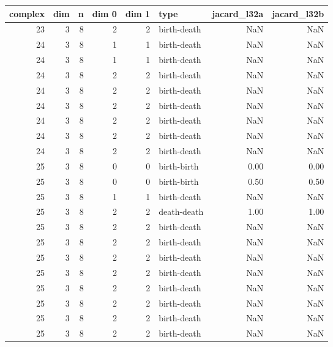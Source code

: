 \documentclass{article}
\begin{document}
\begin{center}
\begin{tabular}{rrrrrlrr}
\toprule
complex & dim & n & dim 0 & dim 1 & type & jacard\_l32a & jacard\_l32b \\
\midrule
23 & 3 & 8 & 2 & 2 & birth-death & NaN & NaN \\
24 & 3 & 8 & 1 & 1 & birth-death & NaN & NaN \\
24 & 3 & 8 & 1 & 1 & birth-death & NaN & NaN \\
24 & 3 & 8 & 2 & 2 & birth-death & NaN & NaN \\
24 & 3 & 8 & 2 & 2 & birth-death & NaN & NaN \\
24 & 3 & 8 & 2 & 2 & birth-death & NaN & NaN \\
24 & 3 & 8 & 2 & 2 & birth-death & NaN & NaN \\
24 & 3 & 8 & 2 & 2 & birth-death & NaN & NaN \\
24 & 3 & 8 & 2 & 2 & birth-death & NaN & NaN \\
25 & 3 & 8 & 0 & 0 & birth-birth & 0.00 & 0.00 \\
25 & 3 & 8 & 0 & 0 & birth-birth & 0.50 & 0.50 \\
25 & 3 & 8 & 1 & 1 & birth-death & NaN & NaN \\
25 & 3 & 8 & 2 & 2 & death-death & 1.00 & 1.00 \\
25 & 3 & 8 & 2 & 2 & birth-death & NaN & NaN \\
25 & 3 & 8 & 2 & 2 & birth-death & NaN & NaN \\
25 & 3 & 8 & 2 & 2 & birth-death & NaN & NaN \\
25 & 3 & 8 & 2 & 2 & birth-death & NaN & NaN \\
25 & 3 & 8 & 2 & 2 & birth-death & NaN & NaN \\
25 & 3 & 8 & 2 & 2 & birth-death & NaN & NaN \\
25 & 3 & 8 & 2 & 2 & birth-death & NaN & NaN \\
25 & 3 & 8 & 2 & 2 & birth-death & NaN & NaN \\
\bottomrule
\end{tabular}
\end{center}
\end{document}
